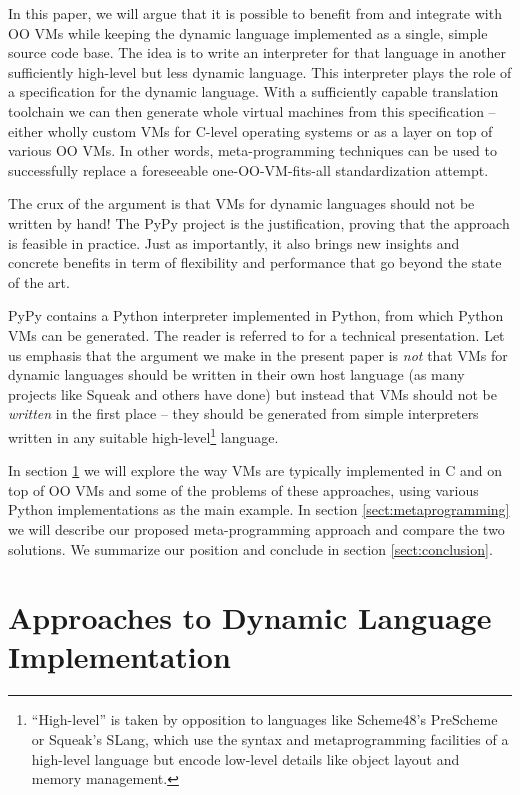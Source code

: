 \documentclass{llncs}
\begin{document}
In this paper, we will argue that it is possible to
benefit from and integrate with OO VMs while keeping the dynamic
language implemented as a single, simple source code base.  The idea is
to write an interpreter for that language in another sufficiently
high-level but less dynamic language.  This interpreter plays the role
of a specification for the dynamic language.  With a sufficiently capable
translation toolchain we can then generate whole virtual machines from
this specification -- either wholly custom VMs for C-level operating
systems or as a layer on top of various OO VMs.  In other words,
meta-programming techniques can be used to successfully replace a
foreseeable one-OO-VM-fits-all standardization attempt.

The crux of the argument is that VMs for dynamic languages should not be
written by hand!  The PyPy project \cite{pypy} is the justification,
proving that the approach is
feasible in practice.  Just as importantly, it also brings new insights
and concrete benefits in term of flexibility and performance that go
beyond the state of the art.

PyPy contains a Python interpreter implemented in Python, from which
Python VMs can be generated.  The reader is referred to
\cite{pypyvmconstruction} for a technical presentation.  Let us emphasis
that the argument we make in the present paper is \emph{not} that
VMs for dynamic languages should be written in their own host language
(as many projects like Squeak \cite{Squeak} and others have done) but
instead that VMs should not be \emph{written} in the first place -- they
should be generated from simple interpreters written in any suitable
high-level\footnote{``High-level'' is taken by opposition to languages
like Scheme48's PreScheme \cite{kelsey-prescheme} or Squeak's \cite{Squeak}
SLang, which use the syntax and
metaprogramming facilities of a high-level language but encode
low-level details like object layout and memory management.} language.

In section \ref{sect:approaches} we will explore the way VMs are typically
implemented in C and on top of OO VMs and some of the problems of these
approaches, using various Python implementations as the main example. In
section \ref{sect:metaprogramming} we will describe our proposed
meta-programming approach and compare the two solutions.  We summarize
our position and conclude in section \ref{sect:conclusion}.


\section{Approaches to Dynamic Language Implementation}
\label{sect:approaches}
\end{document}
